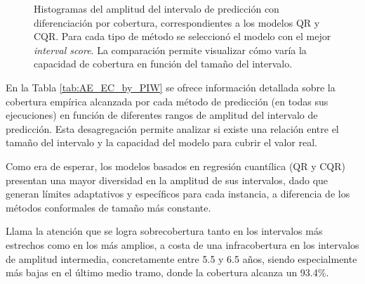 \begin{figure}[h]
    \caption[
        Histogramas del amplitud del intervalo de predicción según cobertura, en los modelos QR y CQR.
    ]{
        Histogramas del amplitud del intervalo de predicción con diferenciación por cobertura, 
        correspondientes a los modelos QR y CQR. Para cada tipo de método se seleccionó el modelo con el mejor 
        \textit{interval score}. La comparación permite visualizar cómo varía la capacidad de cobertura en 
        función del tamaño del intervalo.
    }
    \label{fig:AE_EC_by_PIW}
\end{figure}


En la Tabla \ref{tab:AE_EC_by_PIW} se ofrece información detallada sobre la cobertura empírica alcanzada por 
cada método de predicción (en todas sus ejecuciones) en función de diferentes rangos de amplitud del intervalo 
de predicción. Esta desagregación permite analizar si existe una relación entre el tamaño del intervalo y la 
capacidad del modelo para cubrir el valor real. 

Como era de esperar, los modelos basados en regresión cuantílica (QR y CQR) presentan una mayor diversidad en 
la amplitud de sus intervalos, dado que generan límites adaptativos y específicos para cada instancia, a 
diferencia de los métodos conformales de tamaño más constante.

Llama la atención que se logra sobrecobertura tanto en los intervalos más estrechos como en los más amplios, a 
costa de una infracobertura en los intervalos de amplitud intermedia, concretamente entre 5.5 y 6.5 años, 
siendo especialmente más bajas en el último medio tramo, donde la cobertura alcanza un 93.4\%.



